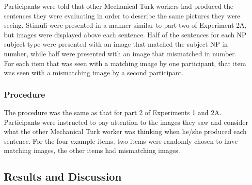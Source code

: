 \documentclass[10pt,letterpaper]{article}
\begin{document}
Participants were told that other Mechanical Turk workers had produced the sentences they were evaluating in order to describe the same pictures they were seeing. Stimuli were presented in a manner similar to part two of Experiment 2A, but images were displayed above each sentence. Half of the sentences for each NP subject type were presented with an image that matched the subject NP in number, while half were presented with an image that mismatched in number. For each item that was seen with a matching image by one participant, that item was seen with a mismatching image by a second participant. 

\subsubsection{Procedure}

The procedure was the same as that for part 2 of Experiments 1 and 2A. Participants were instructed to pay attention to the images they saw and consider what the other Mechanical Turk worker was thinking when he/she produced each sentence. For the four example items, two items were randomly chosen to have matching images, the other items had mismatching images. 


\subsection{Results and Discussion}
\end{document}
